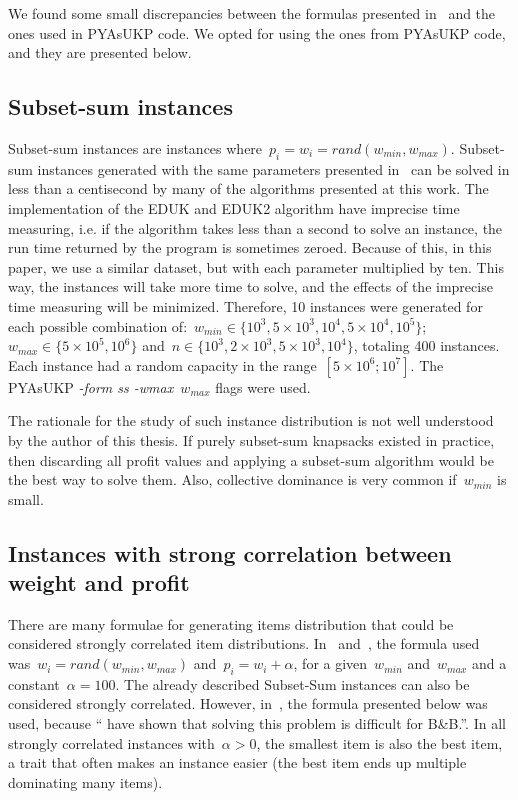 We found some small discrepancies between the formulas presented in~\cite{pya} and the ones used in PYAsUKP code.
We opted for using the ones from PYAsUKP code, and they are presented below.

\subsection{Subset-sum instances}\label{sec:subsetsum}

Subset-sum instances are instances where~\(p_i = w_i = rand(w_{min}, w_{max})\).
Subset-sum instances generated with the same parameters presented in~\cite{pya} can be solved in less than a centisecond by many of the algorithms presented at this work.
The implementation of the EDUK and EDUK2 algorithm have imprecise time measuring, i.e. if the algorithm takes less than a second to solve an instance, the run time returned by the program is sometimes zeroed. 
Because of this, in this paper, we use a similar dataset, but with each parameter multiplied by ten.
This way, the instances will take more time to solve, and the effects of the imprecise time measuring will be minimized.
Therefore, 10 instances were generated for each possible combination of:~\(w_{min} \in \{10^3, 5\times10^3, 10^4, 5\times10^4, 10^5\}\);~\(w_{max} \in \{5\times10^5, 10^6\}\) and~\(n \in \{10^3, 2\times10^3, 5\times10^3, 10^4\}\), totaling 400 instances.
Each instance had a random capacity in the range~\([5\times10^6; 10^7]\).
The PYAsUKP \emph{-form ss -wmax~\(w_{max}\)} flags were used.

The rationale for the study of such instance distribution is not well understood by the author of this thesis.
If purely subset-sum knapsacks existed in practice, then discarding all profit values and applying a subset-sum algorithm would be the best way to solve them.
Also, collective dominance is very common if~\(w_{min}\) is small.

\subsection{Instances with strong correlation between weight and profit}
\label{sec:sc_inst}

There are many formulae for generating items distribution that could be considered strongly correlated item distributions.
In~\cite{mtu2} and~\cite{eduk}, the formula used was~\(w_i = rand(w_{min}, w_{max})\) and~\(p_i = w_i + \alpha\), for a given~\(w_{min}\) and~\(w_{max}\) and a constant~\(\alpha = 100\).
The already described Subset-Sum instances can also be considered strongly correlated.
However, in~\cite{pya}, the formula presented below was used, because ``\cite{chung_hard} have shown that solving this problem is difficult for B\&B.''.
In all strongly correlated instances with~\(\alpha > 0\), the smallest item is also the best item, a trait that often makes an instance easier (the best item ends up multiple dominating many items). 

